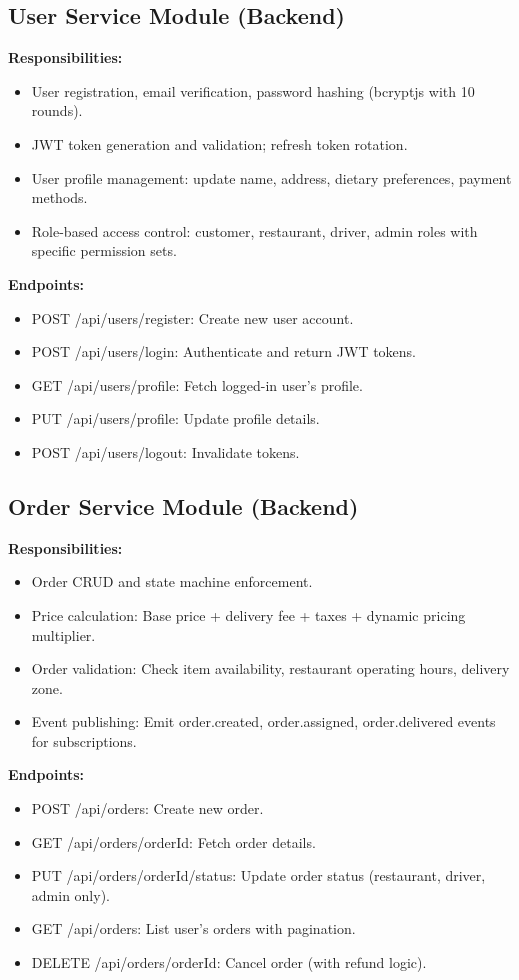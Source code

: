 \documentclass[12pt,a4paper]{report}
\begin{document}
\begin{itemize}
\subsection{User Service Module (Backend)}
\textbf{Responsibilities:}
\begin{itemize}
    \item User registration, email verification, password hashing (bcryptjs with 10 rounds).
    \item JWT token generation and validation; refresh token rotation.
    \item User profile management: update name, address, dietary preferences, payment methods.
    \item Role-based access control: customer, restaurant, driver, admin roles with specific permission sets.
\end{itemize}

\textbf{Endpoints:}
\begin{itemize}
    \item POST /api/users/register: Create new user account.
    \item POST /api/users/login: Authenticate and return JWT tokens.
    \item GET /api/users/profile: Fetch logged-in user's profile.
    \item PUT /api/users/profile: Update profile details.
    \item POST /api/users/logout: Invalidate tokens.
\end{itemize}

\subsection{Order Service Module (Backend)}
\textbf{Responsibilities:}
\begin{itemize}
    \item Order CRUD and state machine enforcement.
    \item Price calculation: Base price + delivery fee + taxes + dynamic pricing multiplier.
    \item Order validation: Check item availability, restaurant operating hours, delivery zone.
    \item Event publishing: Emit order.created, order.assigned, order.delivered events for subscriptions.
\end{itemize}

\textbf{Endpoints:}
\begin{itemize}
    \item POST /api/orders: Create new order.
    \item GET /api/orders/{orderId}: Fetch order details.
    \item PUT /api/orders/{orderId}/status: Update order status (restaurant, driver, admin only).
    \item GET /api/orders: List user's orders with pagination.
    \item DELETE /api/orders/{orderId}: Cancel order (with refund logic).
\end{itemize}


\end{itemize}
\end{document}
